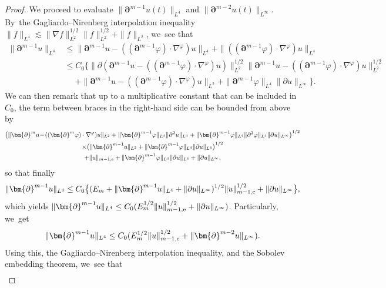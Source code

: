 \documentclass[JEP,XML,SOM,Unicode,NoFloatCountersInSection,published]{cedram}
\theoremstyle{definition}
\begin{document}
\begin{proof}
We proceed to evaluate $\|\bm{\partial}^{m-1}u(t)\|_{L^4}$ and $\|\bm{\partial}^{m-2}u(t)\|_{L^\infty}$. By~the Gagliardo--Nirenberg interpolation inequality $\|f\|_{L^4} \lesssim \|\nabla f\|_{L^2}^{1/2}\|f\|_{L^2}^{1/2} + \|f\|_{L^2}$, we~see that
\begin{align*}
\|\bm{\partial}^{m-1} u\|_{L^4}
&\leq \|\bm{\partial}^{m-1} u - ((\bm{\partial}^{m-1}\varphi)\cdot\nabla^\varphi)u\|_{L^4}
+ \|((\bm{\partial}^{m-1}\varphi)\cdot\nabla^\varphi)u\|_{L^4} \\
&\leq C_0 \bigl\{ \|\partial(\bm{\partial}^{m-1} u \! -\! ((\bm{\partial}^{m-1}\varphi)\cdot\nabla^\varphi)u)\|_{L^2}^{1/2}
\|\bm{\partial}^{m-1} u \!-\! ((\bm{\partial}^{m-1}\varphi)\cdot\nabla^\varphi)u\|_{L^2}^{1/2} \\
&\quad\;
+ \|\bm{\partial}^{m-1} u - ((\bm{\partial}^{m-1}\varphi)\cdot\nabla^\varphi)u\|_{L^2}
+ \|\bm{\partial}^{m-1}\varphi\|_{L^4} \|\partial u\|_{L^\infty} \bigr\} .
\end{align*}
We can then remark that up to a multiplicative constant that can be included in $C_0$, the term between braces in the right-hand side can be bounded from above by
\begin{multline*}
\bigl(\|\bm{\partial}^{m} u \!-\! ((\bm{\partial}^{m}\varphi)\cdot\nabla^\varphi)u\|_{L^2}
+ \|\bm{\partial}^{m-1}\varphi\|_{L^4} \|\partial^2u\|_{L^4}
+ \|\bm{\partial}^{m-1}\varphi\|_{L^4} \|\partial^2\varphi\|_{L^4} \|\partial u\|_{L^\infty} \bigr)^{1/2} \\
\times\bigl(\|\bm{\partial}^{m-1}u\|_{L^2} + \|\bm{\partial}^{m-1}\varphi\|_{L^4} \|\partial u\|_{L^4} \bigr)^{1/2} \\
+ \|u\|_{m-1,{\rm e}} + \|\bm{\partial}^{m-1}\varphi\|_{L^4} \|\partial u\|_{L^4} + \|\partial u\|_{L^\infty},
\end{multline*}
so that finally
\[
\|\bm{\partial}^{m-1} u\|_{L^4}
\leq C_0 \bigl\{ (E_m+\|\bm{\partial}^{m-1} u\|_{L^4}+\|\partial u\|_{L^\infty})^{1/2} \|u\|_{m-1,{\rm e}}^{1/2} + \|\partial u\|_{L^\infty} \bigr\},
\]
which yields $\|\bm{\partial}^{m-1} u\|_{L^4} \leq C_0 (E_m^{1/2}\|u\|_{m-1,{\rm e}}^{1/2} + \|\partial u\|_{L^\infty})$.
Particularly, we~get
\begin{equation}\label{CalIneq1}
\|\bm{\partial}^{m-1} u\|_{L^4} \leq C_0 (E_m^{1/2} \|u\|_{m-1,{\rm e}}^{1/2} + \|\bm{\partial}^{m-2} u\|_{L^\infty}).
\end{equation}
Using this, the Gagliardo--Nirenberg interpolation inequality, and the Sobolev embedding theorem, we~see that
\begin{align*}

\end{align*}
\end{proof}
\end{document}
